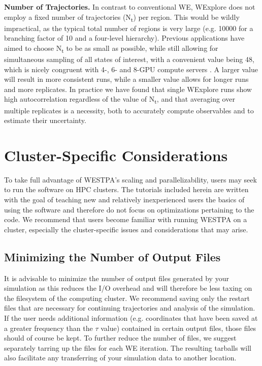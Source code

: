 \documentclass[9pt,tutorial,pubversion]{livecoms}
\begin{document}
\textbf{Number of Trajectories.} In contrast to conventional WE, WExplore does not employ a fixed number of trajectories (N\textsubscript{t}) per region. 
This would be wildly impractical, as the typical total number of regions is very large (e.g. 10000 for a branching factor of 10 and a four-level hierarchy). 
Previous applications have aimed to choose N\textsubscript{t} to be as small as possible, while still allowing for simultaneous sampling of all states of interest, with a convenient value being 48, which is nicely congruent with 4-, 6- and 8-GPU compute servers \citep{Dickson2017,Dixon2018,Lotz2018}. 
A larger value will result in more consistent runs, while a smaller value allows for longer runs and more replicates. 
In practice we have found that single WExplore runs show high autocorrelation regardless of the value of N\textsubscript{t}, and that averaging over multiple replicates is a necessity, both to accurately compute observables and to estimate their uncertainty.

\section{Cluster-Specific Considerations}

To take full advantage of WESTPA’s scaling and parallelizability, users may seek to run the software on HPC clusters.
The tutorials included herein are written with the goal of teaching new and relatively inexperienced users the basics of using the software and therefore do not focus on optimizations pertaining to the code. 
We recommend that users become familiar with running WESTPA on a cluster, especially the cluster-specific issues and considerations that may arise.

\subsection{Minimizing the Number of Output Files}

It is advisable to minimize the number of output files generated by your simulation as this reduces the I/O overhead and will therefore be less taxing on the filesystem of the computing cluster. 
We recommend saving only the restart files that are necessary for continuing trajectories and analysis of the simulation. 
If the user needs additional information (e.g. coordinates that have been saved at a greater frequency than the $\tau$ value) contained in certain output files, those files should of course be kept. 
To further reduce the number of files, we suggest separately tarring up the files for each WE iteration. 
The resulting tarballs will also facilitate any transferring of your simulation data to another location. 
\end{document}
